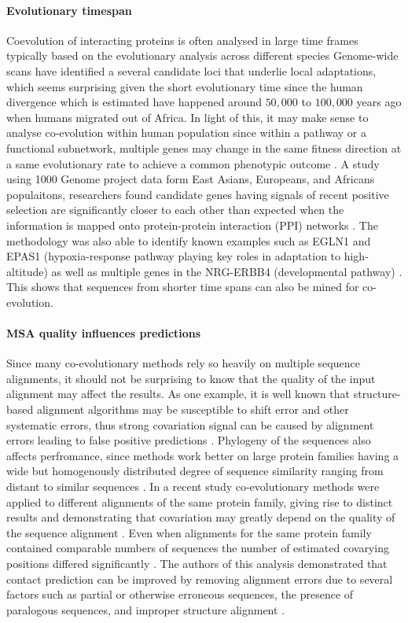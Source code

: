 \paragraph{Evolutionary timespan}
Coevolution of interacting proteins is often analysed in large time frames typically based on the evolutionary analysis across different species  \cite{qian2015recent}
Genome-wide scans have identified a several candidate loci that underlie local adaptations, which seems surprising given the short evolutionary time since the human divergence which is estimated have happened around $50,000$ to $100,000$ years ago when humans migrated out of Africa\cite{qian2015recent}.
In light of this, it may make sense to analyse co-evolution within human population
since within a pathway or a functional subnetwork, multiple genes may change in the same fitness direction at a same evolutionary rate to achieve a common phenotypic outcome \cite{qian2015recent}.
A study using 1000 Genome \cite{REF} project data form East Asians, Europeans, and Africans populaitons, researchers found candidate genes having signals of recent positive selection are significantly closer to each other than expected when the information is mapped onto protein-protein interaction (PPI) networks \cite{qian2015recent}.
The methodology was also able to identify known examples such as EGLN1 and EPAS1 (hypoxia-response pathway playing key roles in adaptation to high-altitude) as well as multiple genes in the NRG-ERBB4 (developmental pathway) \cite{qian2015recent}.
This shows that sequences from shorter time spans can also be mined for co-evolution.

\paragraph{MSA quality influences predictions}
Since many co-evolutionary methods rely so heavily on multiple sequence alignments, it should not be surprising to know that the quality of the input alignment may affect the results.
As one example, it is well known that structure-based alignment algorithms may be susceptible to shift error and other systematic errors, thus strong covariation signal can be caused by alignment errors leading to false positive predictions \cite{dickson2010identifying}.
Phylogeny of the sequences also affects perfromance, since methods work better on large protein families having a wide but homogenously distributed degree of sequence similarity ranging from distant to similar sequences \cite{de2013emerging}.
In a recent study co-evolutionary methods were applied to different alignments of the same protein family, giving rise to distinct results and demonstrating that covariation may greatly depend on the quality of the sequence alignment \cite{dickson2010identifying}.
Even when alignments for the same protein family contained comparable numbers of sequences the number of estimated covarying positions differed significantly \cite{dickson2010identifying}.
The authors of this analysis demonstrated that contact prediction can be improved by removing alignment errors due to several factors such as partial or otherwise erroneous sequences, the presence of paralogous sequences, and improper structure alignment \cite{dickson2010identifying}.


